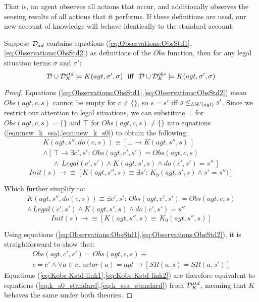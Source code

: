 That is, an agent observes all actions that occur, and additionally
observes the sensing results of all actions that it performs. If these
definitions are used, our new account of knowledge will behave identically
to the standard account: 
\begin{thm}
Suppose $\mathcal{D}_{ad}$ contains equations (\ref{eq:Observations:ObsStd1},\ref{eq:Observations:ObsStd2})
as definitions of the $Obs$ function, then for any legal situation
terms $\sigma$ and $\sigma'$:\[
\mathcal{D}\cup\mathcal{D}_{K}^{std}\models K(agt,\sigma',\sigma)\,\,\,\,\mathrm{iff}\,\,\,\,\mathcal{D}\cup\mathcal{D}_{K}^{obs}\models K(agt,\sigma',\sigma)\]
 \end{thm}
\begin{proof}
Equations (\ref{eq:Observations:ObsStd1},\ref{eq:Observations:ObsStd2})
mean $Obs(agt,c,s)$ cannot be empty for $c\neq\{\}$, so $s=s'$
iff $s\leq_{LbU(agt)}s'$. Since we restrict our attention to legal
situations, we can substitute $\bot$ for $Obs(agt,c,s)=\{\}$ and
$\top$ for $Obs(agt,c,s)\neq\{\}$ into equations (\ref{eqn:new_k_ssa},\ref{eqn:new_k_s0})
to obtain the following:\begin{multline*}
K(agt,s'',do(c,s))\equiv\left[\bot\rightarrow K(agt,s'',s)\,\right]\\
\wedge\left[\,\top\rightarrow\exists c',s':\, Obs(agt,c',s')=Obs(agt,c,s)\right.\\
\left.\,\,\,\,\,\,\,\,\wedge\, Legal(c',s')\wedge K(agt,s',s)\wedge do(c',s')=s''\,\right]\end{multline*}
 \[
Init(s)\rightarrow\equiv\left[K(agt,s'',s)\equiv\exists s':\, K_{0}(agt,s',s)\wedge s'=s'')\right]\]


Which further simplify to:\begin{multline}
K(agt,s'',do(c,s))\equiv\exists c',s':\, Obs(agt,c',s')=Obs(agt,c,s)\\
\wedge\, Legal(c',s')\wedge K(agt,s',s)\wedge do(c',s')=s''\label{eq:Kobs-Kstd-link1}\end{multline}
 \begin{equation}
Init(s)\rightarrow\equiv\left[K(agt,s'',s)\equiv\, K_{0}(agt,s'',s)\right]\label{eq:Kobs-Kstd-link2}\end{equation}


Using equations (\ref{eq:Observations:ObsStd1},\ref{eq:Observations:ObsStd2}),
it is straightforward to show that:\begin{multline*}
Obs(agt,c',s')=Obs(agt,c,s)\equiv\\
c=c'\wedge\forall a\in c:\, actor(a)=agt\rightarrow\left[SR(a,s)=SR(a,s')\right]\end{multline*}
 Equations (\ref{eq:Kobs-Kstd-link1},\ref{eq:Kobs-Kstd-link2}) are
therefore equivalent to equations (\ref{eq:k_s0_standard},\ref{eq:k_ssa_standard})
from $\mathcal{D}_{K}^{std}$, meaning that $K$ behaves the same under both
theories. 
\end{proof}
